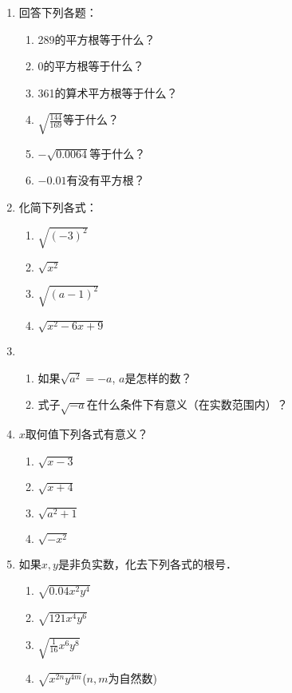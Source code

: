 \begin{ex}
\begin{enumerate}
    \item 回答下列各题：
    \begin{enumerate}
    \item 289的平方根等于什么？
    \item 0的平方根等于什么？
    \item 361的算术平方根等于什么？
    \item $\sqrt{\frac{144}{169}}$等于什么？
    \item $-\sqrt{0.0064}$等于什么？
    \item $-0.01$有没有平方根？
\end{enumerate}



\item 化简下列各式：
\begin{multicols}{2}
    \begin{enumerate}
    \item $\sqrt{(-3)^2}$
    \item $\sqrt{x^2}$
    \item $\sqrt{(a-1)^2}$
    \item $\sqrt{x^2-6x+9}$
\end{enumerate}
\end{multicols}



\item 
\begin{enumerate}
    \item 如果$\sqrt{a^2}=-a$, $a$是怎样的数？
    \item 式子$\sqrt{-a}$在什么条件下有意义（在实数范围内）？
\end{enumerate}


\item $x$取何值下列各式有意义？
\begin{multicols}{2}
  \begin{enumerate}
    \item $\sqrt{x-3}$
    \item $\sqrt{x+4}$
    \item $\sqrt{a^2+1}$
    \item $\sqrt{-x^2}$
\end{enumerate}  
\end{multicols}


\item 如果$x,y$是非负实数，化去下列各式的根号．
\begin{enumerate}
    \item $\sqrt{0.04x^2y^4}$
    \item $\sqrt{121x^4y^6}$
    \item $\sqrt{\frac{1}{16}x^6y^8}$
    \item $\sqrt{x^{2n}y^{4m}}$\quad ($n,m$为自然数)
\end{enumerate}
\end{enumerate}
\end{ex}

